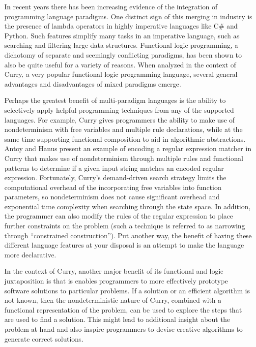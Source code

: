 \documentclass[12pt,letterpaper]{article}
\begin{document}
In recent years there has been increasing evidence of the integration of programming language paradigms.
One distinct sign of this merging in industry is the presence of lambda 
operators in highly imperative languages like C\# and Python. Such features simplify many tasks in an
imperative language, such as searching and filtering large data structures. Functional logic programming, 
a dichotomy of separate and seemingly conflicting paradigms, has been shown to also be quite useful for a variety
of reasons. When analyzed in the context of Curry, a very popular functional logic programming language, 
several general advantages and disadvantages of mixed paradigms emerge.

Perhaps the greatest benefit of multi-paradigm languages is the ability to selectively apply helpful 
programming techniques from any of the supported languages. For example, Curry gives programmers the ability to 
make use of nondeterminism with free variables and multiple rule declarations, while at the same time 
supporting functional composition to aid in algorithmic abstractions. Antoy and Hanus 
\cite{Antoy2010} present an example of encoding a regular expression matcher in Curry that makes use of nondeterminism through multiple rules and functional patterns to determine if 
a given input string matches an encoded regular expression. Fortunately, Curry's demand-driven search
strategy limits the computational overhead of the incorporating free variables into function parameters, so 
nondeterminism does not cause significant overhead and exponential time complexity when searching through the 
state space. In addition, the programmer can also modify the rules of the regular expression to place 
further constraints on the problem (such a technique is referred to as narrowing through ``constrained 
construction''). Put another way, the benefit of having these different language features at your disposal 
is an attempt to make the language more declarative. 

In the context of Curry, another major benefit of its functional and logic juxtaposition is that 
is enables programmers to more effectively prototype software solutions to particular problems.
If a solution or an efficient algorithm is not known, then the nondeterministic nature of Curry, combined
with a functional representation of the problem, can be used to explore the steps that are used
to find a solution. This might lead to additional insight about the problem at hand and also inspire
programmers to devise creative algorithms to generate correct solutions. 
\end{document}
